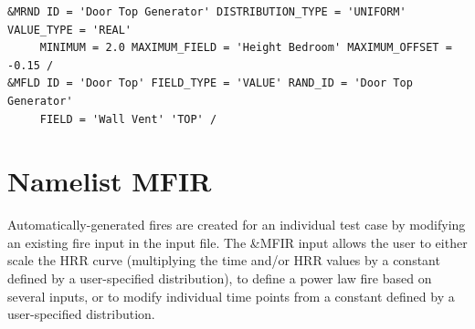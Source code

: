 \documentclass[12pt,twoside]{book}
\begin{document}
\begin{lstlisting}[basicstyle=\scriptsize]
&MRND ID = 'Door Top Generator' DISTRIBUTION_TYPE = 'UNIFORM' VALUE_TYPE = 'REAL'
     MINIMUM = 2.0 MAXIMUM_FIELD = 'Height Bedroom' MAXIMUM_OFFSET = -0.15 /
&MFLD ID = 'Door Top' FIELD_TYPE = 'VALUE' RAND_ID = 'Door Top Generator'
     FIELD = 'Wall Vent' 'TOP' /
\end{lstlisting}


\clearpage

\section{Namelist MFIR}
\label{info:MFIR}

Automatically-generated fires are created for an individual test case by modifying an existing fire input in the input file. The {\ct \&MFIR} input allows the user to either scale the HRR curve (multiplying the time and/or HRR values by a constant defined by a user-specified distribution), to define a power law fire based on several inputs, or to modify individual time points from a constant defined by a user-specified distribution.
\end{document}
